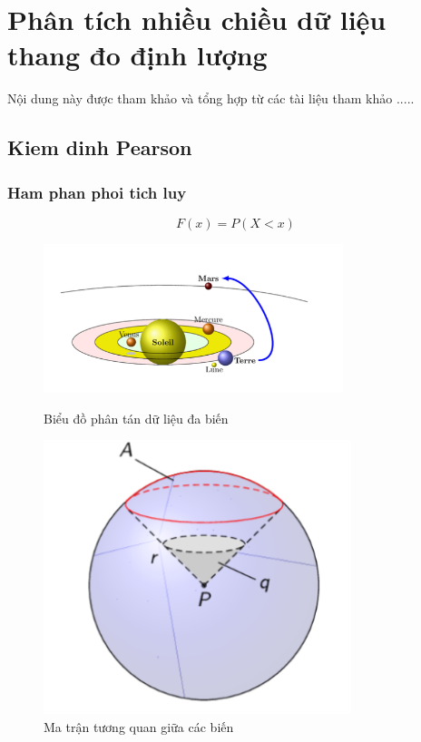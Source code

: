 \chapter{Phân tích nhiều chiều dữ liệu thang đo định lượng}


Nội dung này được tham khảo và tổng hợp từ các tài liệu tham khảo  .....

\section{Kiem dinh Pearson}
\subsection{Ham phan phoi tich luy}
\begin{equation}
    F(x) = P(X<x)
\end{equation}
\begin{figure}[h]
    \centering
    \begin{minipage}{0.45\textwidth}
        \centering
        \includegraphics[width=\textwidth]{../../assets/images/figure-2.png}
        \caption{Biểu đồ phân tán dữ liệu đa biến}
        \label{fig:scatter_multivariate}
    \end{minipage}
    \hfill
    \begin{minipage}{0.45\textwidth}
        \centering
        \includegraphics[width=0.8\textwidth]{../../assets/images/figure-3.png}
        \caption{Ma trận tương quan giữa các biến}
        \label{fig:correlation_matrix}
    \end{minipage}
\end{figure}

